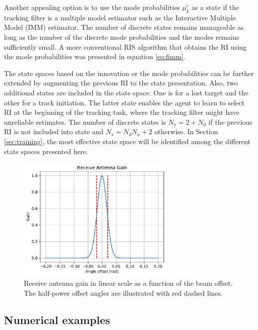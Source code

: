 \documentclass[english, 12pt, a4paper, elec, utf8, a-1b, online]{aaltothesis}
\numberwithin{equation}{section}
\newcommand{\modeprob}{\mu_k^i}
\begin{document}
Another appealing option is to use the mode probabilities $\modeprob$ as a state if the tracking filter is a multiple model estimator such as the Interactive Multiple Model (IMM) estimator. 
The number of discrete states remains manageable as long as the number of the discrete mode probabilities and the modes remains sufficiently small. 
A more conventional RIS algorithm that obtains the RI using the mode probabilities was presented in equation \eqref{eq:fimm}.

The state spaces based on the innovation or the mode probabilities can be further extended by augmenting the previous RI to the state presentation.
Also, two additional states are included in the state space. 
One is for a lost target and the other for a track initiation.
The latter state enables the agent to learn to select RI at the beginning of the tracking task, where the tracking filter might have unreliable estimates.
The number of discrete states is $N_s = 2+N_d$ if the previous RI is not included into state and $N_s = N_d N_a + 2$ otherwise.
In Section \ref{sec:training}, the most effective state space will be identified among the different state spaces presented here.


\begin{figure}[t]
    \centering
    \includegraphics[width=0.68\textwidth]{figures/benchmark/rx_antenna_gain.pdf}
    \caption{Receive antenna gain in linear scale as a function of the beam offset. 
    The half-power offset angles are illustrated with red dashed lines.}
    \label{fig:beamwidth}
\end{figure}

\subsection{Numerical examples}\label{sec:ri_setup}
\end{document}
